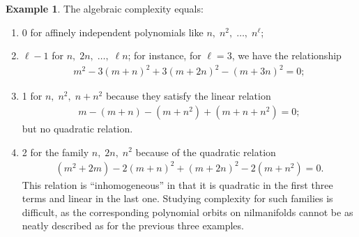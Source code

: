 \documentclass[11pt]{amsart}
\theoremstyle{definition}
\newtheorem{example}[lemma]{Example}
\newcommand{\1}{{\mathbf{1}}}
\begin{document}
\begin{example}
The algebraic complexity equals:
\begin{enumerate}
        \item 0 for affinely independent polynomials like $n,\; n^2,\; \ldots,\; n^\ell$;
        \item $\ell-1$ for $n,\; 2n,\; \ldots, \; \ell n$; for instance, for $\ell=3$, we have the relationship
        \begin{align*}
            m^2 - 3(m+n)^2 + 3(m+2n)^2 - (m+3n)^2 = 0;
        \end{align*}
        \item 1 for $n,\; n^2,\; n+n^2$ because they satisfy the linear relation
        \begin{align*}
            m - (m+n) - (m +n^2) + (m+n+n^2) = 0;
        \end{align*}
        but no quadratic relation.
        \item 2 for the family $n,\; 2n,\; n^2$ because of the quadratic relation
        \begin{align*}
            (m^2 + 2m) - 2(m+n)^2 + (m+2n)^2 - 2(m+n^2) = 0.
        \end{align*}
        This relation is ``inhomogeneous'' in that it is quadratic in the first three terms and linear in the last one. Studying complexity for such families is difficult, as the corresponding polynomial orbits on nilmanifolds cannot be as neatly described as for the previous three examples. 
    \end{enumerate}
\end{example}
\end{document}
